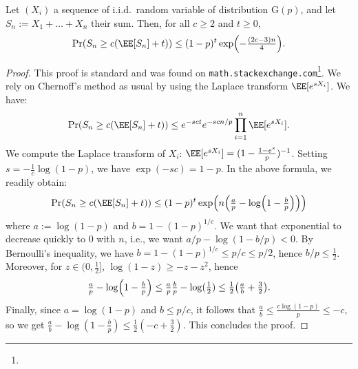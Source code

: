 \documentclass[preprint,cleveref,12pt]{colt2025}
\DeclarePairedDelimiter{\parens}{(}{)}	%
\begin{document}
    \begin{lemma}
        \label{lemma_tail_bound_geometric}
        Let $(X_i)$ a sequence of i.i.d.~random variable of distribution $\mathrm{G}(p)$, and let $S_n := X_1 + \ldots + X_n$ their sum.
        Then, for all $c \ge 2$ and $t \ge 0$,
        \begin{equation*}
            \Pr\parens*{
                S_n \ge c \parens*{\EE[S_n] + t}
            }
            \le 
            (1 - p)^t
            \exp\parens*{
                -\tfrac{(2c-3)n}{4}
            }.
        \end{equation*}
    \end{lemma}
    \begin{proof}
        This proof is standard and was found on \texttt{math.stackexchange.com}\footnote{
        }.
        We rely on Chernoff's method as usual by using the Laplace transform $\EE[e^{sX_i}]$. 
        We have:
        \begin{equation*}
            \Pr(S_n \ge c(\EE[S_n]+t))
            \le
            e^{-sct}
            e^{-scn/p}
            \prod_{i=1}^n
            \EE[e^{sX_i}].
        \end{equation*}
        We compute the Laplace transform of $X_i$: $\EE[e^{sX_i}] = (1 - \frac{1-e^s}{p})^{-1}$. 
        Setting $s = - \frac 1c \log(1-p)$, we have $\exp(-sc) = 1-p$.
        In the above formula, we readily obtain:
        \begin{equation*}
            \Pr(S_n \ge c(\EE[S_n]+t))
            \le
            (1-p)^t 
            \exp\parens*{
                n\parens*{
                    \tfrac ap
                    - \log\parens*{1 - \tfrac bp}
                }
            }
        \end{equation*}
        where $a := \log(1-p)$ and $b = 1 - (1-p)^{1/c}$. 
        We want that exponential to decrease quickly to $0$ with $n$, i.e., we want $a/p - \log(1-b/p) < 0$. 
        By Bernoulli's inequality, we have $b = 1 - (1-p)^{1/c} \le p/c \le p/2$, hence $b/p \le \frac 12$. 
        Moreover, for $z \in (0, \tfrac 12]$, $\log(1-z) \ge -z-z^2$, hence
        \begin{equation*}
            \tfrac ap - \log\parens*{1 - \tfrac bp}
            \le
            \tfrac ap \tfrac bp - \log(\tfrac 12)
            \le 
            \tfrac 12 \parens*{\tfrac ab + \tfrac 32}.
        \end{equation*}
        Finally, since $a = \log(1-p)$ and $b \le p/c$, it follows that $\frac ab \le \frac{c\log(1-p)}p \le -c$, so we get $\frac ab - \log(1 - \frac bp) \le \frac 12(-c + \frac 32)$. 
        This concludes the proof. 
    \end{proof}
\end{document}
